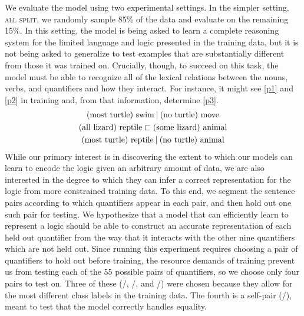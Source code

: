 We evaluate the model using two experimental settings. In the simpler
setting, \textsc{all split}, we randomly sample 85\% of the data and evaluate on the
remaining 15\%. In this setting, the model is being asked to learn a
complete reasoning system for the limited language and logic presented
in the training data, but it is not being asked to generalize to test
examples that are substantially different from those it was trained
on. Crucially, though, to succeed on this task, the model must be able
to recognize all of the lexical relations between the nouns, verbs,
and quantifiers and how they interact. For instance, it might see
\eqref{p1} and \eqref{p2} in training and, from that information,
determine \eqref{p3}.
%
%
\begin{gather}
  \text{(most turtle) swim} \mathbin{|} \text{(no turtle) move}\label{p1}
  \\
  \text{(all lizard) reptile} \sqsubset  \text{(some lizard) animal}\label{p2}
  \\
  \text{(most turtle) reptile} \mathbin{|} \text{(no turtle) animal}\label{p3}
\end{gather}
%
%
While our primary interest is in discovering the extent to which our
models can learn to encode the logic given an arbitrary amount of
data, we are also interested in the degree to which they can infer a
correct representation for the logic from more constrained training
data. To this end, we segment the sentence pairs according to which
quantifiers appear in each pair, and then hold out one such pair for
testing. We hypothesize that a model that can efficiently learn to
represent a logic should be able to construct an accurate
representation of each held out quantifier from the way that it
interacts with the other nine quantifiers which are not held
out. Since running this experiment requires choosing a pair of
quantifiers to hold out before training, the resource demands of
training prevent us from testing each of the 55 possible 
pairs of quantifiers, so we choose only four pairs to test on.  Three
of these (/, /, and
/) were chosen because they allow for the most
different class labels in the training data. The fourth is a
self-pair (/), meant to test that the model correctly
handles equality.

